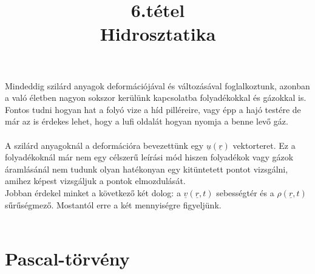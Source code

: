 \documentclass[a4paper]{article}
\title{%
  6.tétel \\
  \large Hidrosztatika}
\date{}
\begin{document}
\maketitle

Mindeddig szilárd anyagok deformációjával és változásával foglalkoztunk, azonban a való életben nagyon sokszor kerülünk kapcsolatba folyadékokkal és gázokkal is. Fontos tudni hogyan hat a folyó vize a híd pilléreire, vagy épp a hajó testére de már az is érdekes lehet, hogy a lufi oldalát hogyan nyomja a benne levő gáz.
\\
\\
A szilárd anyagoknál a deformációra bevezettünk egy $\underline{u}(\underline{r})$ vektorteret. Ez a folyadékoknál már nem egy célszerű leírási mód hiszen folyadékok vagy gázok áramlásánál nem tudunk olyan hatékonyan egy kitüntetett pontot vizsgálni, amihez képest vizsgáljuk a pontok elmozdulását.
\\
Jobban érdekel minket a következő két dolog: a $\underline{v}(\underline{r},t)$ sebességtér és a $\rho(\underline{r},t)$ sűrűségmező. Mostantól erre a két mennyiségre figyeljünk.
\\
\\
\section{Pascal-törvény}
\end{document}
